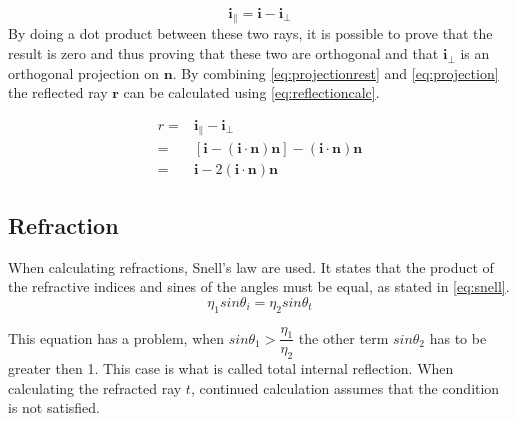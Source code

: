 \documentclass[a4paper, 12pt]{report}
\begin{document}
\begin{equation} \label{eq:projectionrest}
\mathbf{i}_\| = \mathbf{i} - \mathbf{i}_\bot
\end{equation}
By doing a dot product between these two rays, it is possible to prove that the result is zero and thus proving that these two are orthogonal and that $ \mathbf{i}_\bot $ is an orthogonal projection on $ \mathbf{n} $. 
By combining \autoref{eq:projectionrest} and \autoref{eq:projection} the reflected ray $ \mathbf{r} $ can be calculated using \autoref{eq:reflectioncalc}.

\begin{subequations}\label{eq:reflectioncalc}
\begin{align}
r =& \mathbf{i}_\| - \mathbf{i}_\bot \\
  =& [\mathbf{i} - (\mathbf{i} \cdot \mathbf{n})\mathbf{n}] - (\mathbf{i} \cdot \mathbf{n}) \mathbf{n} \\
  =& \mathbf{i} - 2 ( \mathbf{i} \cdot \mathbf{n} ) \mathbf{n}
\end{align}
\end{subequations}


\subsection{Refraction}

When calculating refractions, Snell's law are used. 
It states that the product of the refractive indices and sines of the angles must be equal, as stated in \autoref{eq:snell}.\\

\begin{equation} \label{eq:snell}
\eta_1 sin \theta_i = \eta_2 sin \theta_t
\end{equation}

This equation has a problem, when $ sin \theta_1 > \dfrac{\eta_1}{\eta_2} $
the other term $ sin \theta_2 $ has to be greater then 1. 
This case is what is called total internal reflection.
When calculating the refracted ray $ t $, continued calculation assumes that the condition is not satisfied.\\
\end{document}
